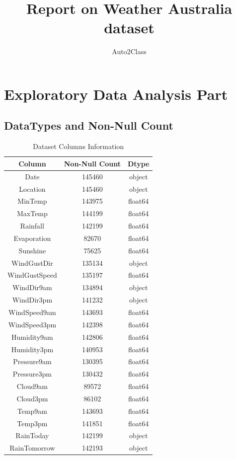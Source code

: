 \documentclass{article}%
\title{Report on Weather Australia dataset}%
\author{Auto2Class}%
\begin{document}
%
\normalsize%
\maketitle%
\newpage%
\tableofcontents%
\newpage%
\section{Exploratory Data Analysis Part}%
\label{sec:ExploratoryDataAnalysisPart}%
\subsection{DataTypes and Non{-}Null Count}%
\label{subsec:DataTypesandNon{-}NullCount}%


\begin{table}[h!]%
\caption{Dataset Columns Information}%
\vspace{0.2cm}%
\centering%
\begin{tabular}{|c|c|c|}%
\hline%
Column&Non{-}Null Count&Dtype\\%
\hline%
Date&145460&object\\%
Location&145460&object\\%
MinTemp&143975&float64\\%
MaxTemp&144199&float64\\%
Rainfall&142199&float64\\%
Evaporation&82670&float64\\%
Sunshine&75625&float64\\%
WindGustDir&135134&object\\%
WindGustSpeed&135197&float64\\%
WindDir9am&134894&object\\%
WindDir3pm&141232&object\\%
WindSpeed9am&143693&float64\\%
WindSpeed3pm&142398&float64\\%
Humidity9am&142806&float64\\%
Humidity3pm&140953&float64\\%
Pressure9am&130395&float64\\%
Pressure3pm&130432&float64\\%
Cloud9am&89572&float64\\%
Cloud3pm&86102&float64\\%
Temp9am&143693&float64\\%
Temp3pm&141851&float64\\%
RainToday&142199&object\\%
RainTomorrow&142193&object\\%
\hline%
\end{tabular}%
\end{table}
\end{document}
